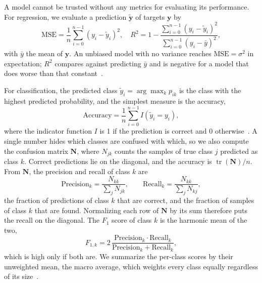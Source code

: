 A model cannot be trusted without any metrics for evaluating its performance.
For regression, we evaluate a prediction $\tilde{\bm{y}}$ of targets $\bm{y}$ by
\begin{equation}
    \mathrm{MSE} = \frac{1}{n}\sum_{i=0}^{n-1}(y_i-\tilde{y}_i)^2, \quad
    R^2 = 1 - \frac{\sum_{i=0}^{n-1} (y_i - \tilde{y}_i)^2}{\sum_{i=0}^{n-1} (y_i - \bar{y})^2},
\end{equation}
with $\bar{y}$ the mean of $\bm{y}$. An unbiased model with no variance reaches
$\mathrm{MSE} = \sigma^2$ in expectation; $R^2$ compares against predicting
$\bar{y}$ and is negative for a model that does worse than that constant~\cite{hjorth-jensen_2026}.

For classification, the predicted class $\tilde{y}_i = \arg\max_k p_{ik}$ is the class with the
highest predicted probability, and the simplest measure is the accuracy,
\begin{equation}\label{eq:accuracy}
    \text{Accuracy} = \frac{1}{n}\sum_{i=0}^{n-1} I(\tilde{y}_i = y_i),
\end{equation}
where the indicator function $I$ is 1 if the prediction is correct and 0
otherwise~\cite{hjorth-jensen_2026}. A single number hides which classes are confused with
which, so we also compute the confusion matrix $\bm{N}$, where $N_{jk}$ counts the samples of
true class $j$ predicted as class $k$. Correct predictions lie on the diagonal, and the
accuracy is $\operatorname{tr}(\bm{N})/n$. From $\bm{N}$, the precision and recall of class $k$ are
\begin{equation}\label{eq:precision-recall}
    \text{Precision}_k = \frac{N_{kk}}{\sum_j N_{jk}}, \qquad
    \text{Recall}_k = \frac{N_{kk}}{\sum_j N_{kj}},
\end{equation}
the fraction of predictions of class $k$ that are correct, and the fraction of samples of
class $k$ that are found. Normalizing each row of $\bm{N}$ by its sum therefore puts the recall
on the diagonal. The $F_1$ score of class $k$ is the harmonic mean of the two,
\begin{equation}\label{eq:f1}
    F_{1,k} = 2\,\frac{\text{Precision}_k \cdot \text{Recall}_k}
    {\text{Precision}_k + \text{Recall}_k},
\end{equation}
which is high only if both are. We summarize the per-class scores by their unweighted mean,
the macro average, which weights every class equally regardless of its
size~\cite{hjorth-jensen_2026}.
